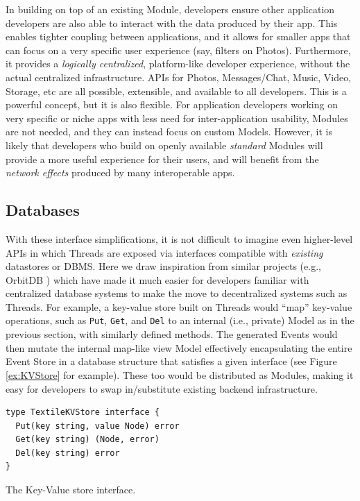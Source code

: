 \documentclass{textile}
\begin{document}
In building on top of an existing Module, developers ensure other application developers are also able to interact with the data produced by their app. This enables tighter coupling between applications, and it allows for smaller apps that can focus on a very specific user experience (say, filters on Photos). Furthermore, it provides a \emph{logically centralized}, platform-like developer experience, without the actual centralized infrastructure. APIs for Photos, Messages/Chat, Music, Video, Storage, etc are all possible, extensible, and available to all developers. This is a powerful concept, but it is also flexible. For application developers working on very specific or niche apps with less need for inter-application usability, Modules are not needed, and they can instead focus on custom Models. However, it is likely that developers who build on openly available \emph{standard} Modules will provide a more useful experience for their users, and will benefit from the \emph{network effects} \cite{shapiroInformationRulesStrategic1998} produced by many interoperable apps.

\subsection{Databases}\label{sec:databases}

With these interface simplifications, it is not difficult to imagine even higher-level APIs in which Threads are exposed via interfaces compatible with \emph{existing} datastores or DBMS. Here we draw inspiration from similar projects (e.g., OrbitDB \cite{markroberthendersonOrbitDBFieldManual2019}) which have made it much easier for developers familiar with centralized database systems to make the move to decentralized systems such as Threads. For example, a key-value store built on Threads would ``map'' key-value operations, such as \texttt{Put}, \texttt{Get}, and \texttt{Del} to an internal (i.e., private) Model as in the previous section, with similarly defined methods. The generated Events would then mutate the internal map-like view Model effectively encapsulating the entire Event Store in a database structure that satisfies a given interface (see Figure \ref{ex:KVStore} for example). These too would be distributed as Modules, making it easy for developers to swap in/substitute existing backend infrastructure.

\begin{example}
  \begin{minipage}{.45\textwidth}
    \begin{lstlisting}
type TextileKVStore interface {
  Put(key string, value Node) error
  Get(key string) (Node, error)
  Del(key string) error
}
    \end{lstlisting}
  \end{minipage}
\caption{The Key-Value store interface.}
 \label{ex:KVStore}
\end{example}
\end{document}
